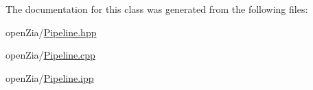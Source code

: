 The documentation for this class was generated from the following files\+:\begin{DoxyCompactItemize}
\item 
open\+Zia/\mbox{\hyperlink{_pipeline_8hpp}{Pipeline.\+hpp}}\item 
open\+Zia/\mbox{\hyperlink{_pipeline_8cpp}{Pipeline.\+cpp}}\item 
open\+Zia/\mbox{\hyperlink{_pipeline_8ipp}{Pipeline.\+ipp}}\end{DoxyCompactItemize}
